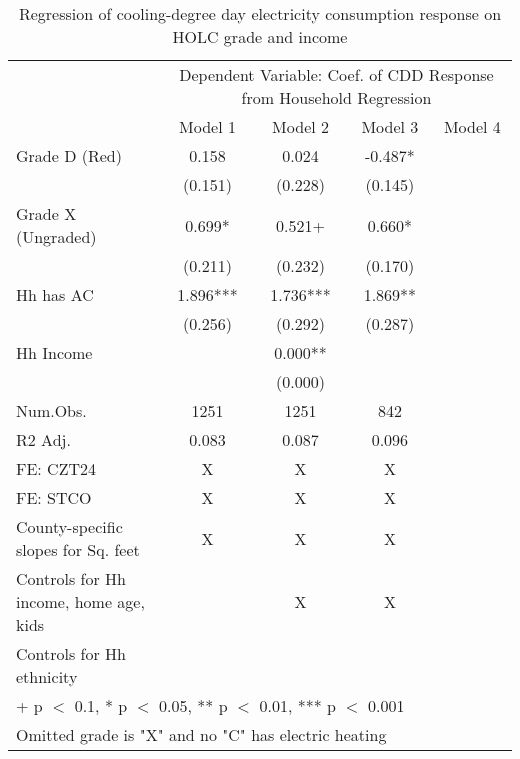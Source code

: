 \documentclass[border=1mm, preview]{standalone}
\begin{document}
\begin{table}

\caption{Regression of cooling-degree day electricity consumption response on HOLC grade and income\label{tab:responseelectric1}}
\centering
\begin{tabular}[t]{lccc>{}c}
\toprule
\multicolumn{1}{c}{ } & \multicolumn{4}{c}{Dependent Variable: Coef. of CDD Response from Household Regression} \\
\cmidrule(l{3pt}r{3pt}){2-5}
  & Model 1 & Model 2 & Model 3 & Model 4\\
\midrule
Grade D (Red) & 0.158 & 0.024 & -0.487* & \cellcolor{blue}{\textcolor{white}{-0.792+}}\\
 & (0.151) & (0.228) & (0.145) & \cellcolor{blue}{\textcolor{white}{(0.391)}}\\
Grade X (Ungraded) & 0.699* & 0.521+ & 0.660* & \cellcolor{blue}{\textcolor{white}{0.243}}\\
 & (0.211) & (0.232) & (0.170) & \cellcolor{blue}{\textcolor{white}{(0.361)}}\\
Hh has AC & 1.896*** & 1.736*** & 1.869** & \cellcolor{blue}{\textcolor{white}{1.727**}}\\
 & (0.256) & (0.292) & (0.287) & \cellcolor{blue}{\textcolor{white}{(0.358)}}\\
Hh Income &  & 0.000** &  & \cellcolor{blue}{\textcolor{white}{0.000***}}\\
 &  & (0.000) &  & \cellcolor{blue}{\textcolor{white}{(0.000)}}\\
\midrule
Num.Obs. & 1251 & 1251 & 842 & \cellcolor{blue}{\textcolor{white}{776}}\\
R2 Adj. & 0.083 & 0.087 & 0.096 & \cellcolor{blue}{\textcolor{white}{0.103}}\\
FE: CZT24 & X & X & X & \cellcolor{blue}{\textcolor{white}{X}}\\
FE: STCO & X & X & X & \cellcolor{blue}{\textcolor{white}{X}}\\
County-specific slopes for Sq. feet & X & X & X & \cellcolor{blue}{\textcolor{white}{X}}\\
Controls for Hh income, home age, kids &  & X & X & \cellcolor{blue}{\textcolor{white}{X}}\\
Controls for Hh ethnicity &  &  &  & \cellcolor{blue}{\textcolor{white}{X}}\\
\bottomrule
\multicolumn{5}{l}{\textsuperscript{} + p $<$ 0.1, * p $<$ 0.05, ** p $<$ 0.01, *** p $<$ 0.001}\\
\multicolumn{5}{l}{\textsuperscript{} Omitted grade is "X" and no "C" has electric heating}\\
\end{tabular}
\end{table}
\end{document}
